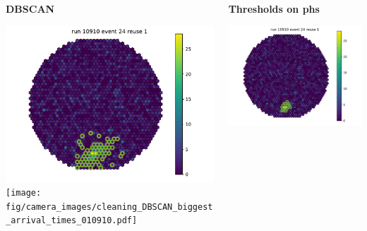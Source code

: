 \begin{withoutheadline}
  \begin{frame}{}
    \begin{columns}[onlytextwidth]
      \begin{column}{0.33\textwidth}
        \centering
        \textbf{DBSCAN}\par\medskip
        \includegraphics[width=\textwidth, page=54]{fig/camera_images/cleaning_DBSCAN_biggest_pe_010910.pdf}
        \texttt{[image: fig/camera\_images/cleaning\_DBSCAN\_biggest\_arrival\_times\_010910.pdf]}
      \end{column}
    \hfill%
      \begin{column}{0.33\textwidth}
        \centering
        \textbf{Thresholds on phs}\par\medskip
        \includegraphics[width=\textwidth, page=43]{fig/camera_images/cleaning_thresh_pe_010910.pdf}

\end{column}
\end{columns}
\end{frame}
\end{withoutheadline}
